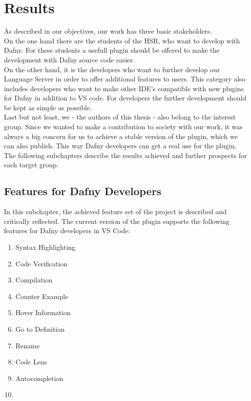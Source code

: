 \section{Results}
\label{section:results}


As described in our objectives, our work has three basic stakeholders. \\

On the one hand there are the students of the HSR, who want to develop with Dafny.
For these students a usefull plugin should be offered to make the development with Dafny source code easier. \\

On the other hand, it is the developers who want to further develop our Language Server in order to offer additional features to users.
This category also includes developers who want to make other IDE's compatible with new plugins for Dafny in addition to VS code.
For developers the further development should be kept as simple as possible. \\

Last but not least, we - the authors of this thesis - also belong to the interest group.
Since we wanted to make a contribution to society with our work,
it was always a big concern for us to achieve a stable version of the plugin, which we can also publish.
This way Dafny developers can get a real use for the plugin. \\

The following subchapters describe the results achieved and further prospects for each target group.

\subsection{Features for Dafny Developers}
In this subchapter, the achieved feature set of the project is described and critically reflected.
The current version of the plugin supports the following features for Dafny developers in VS Code:
\begin{enumerate}
    \item Syntax Highlighting
    \item Code Verification
    \item Compilation
    \item Counter Example
    \item Hover Information
    \item Go to Definition
    \item Rename
    \item Code Lens
    \item Autocompletion
    \item  {}
\end{enumerate}

